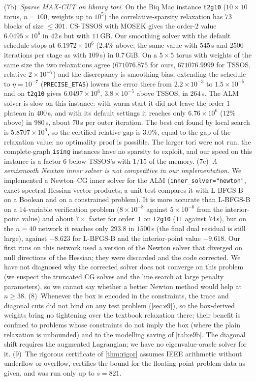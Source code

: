\documentclass[a4paper,11pt]{article}
\theoremstyle{plain}
\theoremstyle{definition}
\theoremstyle{remark}
\begin{document}
(7b)~\emph{Sparse MAX-CUT on library tori.} On the Biq Mac instance \texttt{t2g10} ($10\times10$ torus, $n=100$, weights up to $10^5$) the correlative-sparsity relaxation has $73$ blocks of size $\le301$. CS-TSSOS with MOSEK gives the order-$2$ value $6.0495\times10^6$ in $42$\,s but with $11$\,GB. Our smoothing solver with the default schedule stops at $6.1972\times10^6$ ($2.4\%$ above; the same value with $545$\,s and $2500$ iterations per stage as with $109$\,s) in $0.7$\,GiB. On a $5\times5$ torus with weights of the same size the two relaxations agree ($671076.875$ for ours, $671076.9999$ for TSSOS, relative $2\times10^{-7}$) and the discrepancy is smoothing bias; extending the schedule to $\eta=10^{-7}$ (\texttt{PRECISE\_ETAS}) lowers the error there from $2.2\times10^{-3}$ to $1.5\times10^{-5}$ and on \texttt{t2g10} gives $6.0497\times10^6$, $3.8\times10^{-5}$ above TSSOS, in $264$\,s. The ALM solver is slow on this instance: with warm start it did not leave the order-$1$ plateau in $400$\,s, and with its default settings it reaches only $6.76\times10^6$ ($12\%$ above) in $980$\,s, about $70$\,s per outer iteration. The best cut found by local search is $5.8707\times10^6$, so the certified relative gap is $3.0\%$, equal to the gap of the relaxation value; no optimality proof is possible. The larger tori were not run, the complete-graph \texttt{ising} instances have no sparsity to exploit, and our speed on this instance is a factor $6$ below TSSOS's with $1/15$ of the memory.
(7c)~\emph{A semismooth Newton inner solver is not competitive in our implementation.} We implemented a Newton--CG inner solver for the ALM (\texttt{inner\_solver="newton"}, exact spectral Hessian-vector products; a unit test compares it with L-BFGS-B on a Boolean and on a constrained problem). It is more accurate than L-BFGS-B on a $14$-variable verification problem ($8\times10^{-8}$ against $5\times10^{-6}$ from the interior-point value) and about $7\times$ faster for order~$1$ on \texttt{t2g10} ($11$ against $74$\,s), but on the $n=40$ network it reaches only $293.8$ in $1500$\,s (the final dual residual is still large), against $-8.623$ for L-BFGS-B and the interior-point value $-9.618$. Our first runs on this network used a version of the Newton solver that diverged on null directions of the Hessian; they were discarded and the code corrected. We have not diagnosed why the corrected solver does not converge on this problem (we suspect the truncated CG solves and the line search at large penalty parameters), so we cannot say whether a better Newton method would help at $n\ge38$.
(8)~Whenever the box is encoded in the constraints, the trace and diagonal cuts did not bind on any test problem (\cref{sec:e9}), so the box-derived weights bring no tightening over the textbook relaxation there; their benefit is confined to problems whose constraints do not imply the box (where the plain relaxation is unbounded) and to the modelling saving of \cref{tab:e9b}. The diagonal shift requires the augmented Lagrangian; we have no eigenvalue-oracle solver for it.
(9)~The rigorous certificate of \cref{thm:rigor} assumes IEEE arithmetic without underflow or overflow, certifies the bound for the floating-point problem data as given, and was run only up to $s=821$.
\end{document}
